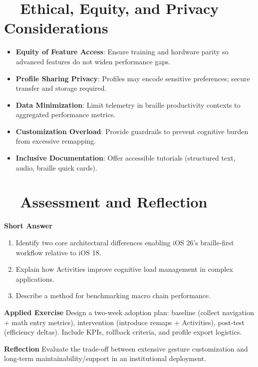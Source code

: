 \section{~~Ethical, Equity, and Privacy Considerations}
\label{sec:sr30-ethics}
\begin{itemize}
	\item \textbf{Equity of Feature Access}: Ensure training and hardware parity so advanced features do not widen performance gaps.
	\item \textbf{Profile Sharing Privacy}: Profiles may encode sensitive preferences; secure transfer and storage required.
	\item \textbf{Data Minimization}: Limit telemetry in braille productivity contexts to aggregated performance metrics.
	\item \textbf{Customization Overload}: Provide guardrails to prevent cognitive burden from excessive remapping.
	\item \textbf{Inclusive Documentation}: Offer accessible tutorials (structured text, audio, braille quick cards).
\end{itemize}

\section{~~Assessment and Reflection}
\label{sec:sr30-assessment}
\textbf{Short Answer}
\begin{enumerate}
	\item Identify two core architectural differences enabling iOS 26’s braille-first workflow relative to iOS 18.
	\item Explain how Activities improve cognitive load management in complex applications.
	\item Describe a method for benchmarking macro chain performance.
\end{enumerate}

\textbf{Applied Exercise} Design a two-week adoption plan: baseline (collect navigation + math entry metrics), intervention (introduce remaps + Activities), post-test (efficiency deltas). Include KPIs, rollback criteria, and profile export logistics.

\textbf{Reflection} Evaluate the trade-off between extensive gesture customization and long-term maintainability/support in an institutional deployment.

